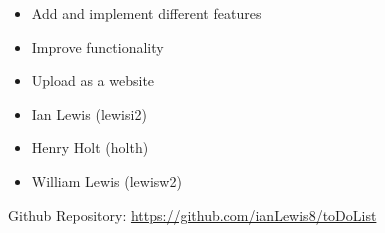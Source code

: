 \documentclass[12pt]{article}
\begin{document}
\begin{itemize}
  \item Add and implement different features
  \item Improve functionality
  \item Upload as a website
\end{itemize}

\newpage


\begin{itemize}
  \item Ian Lewis (lewisi2)
  \item Henry Holt (holth)
  \item William Lewis (lewisw2)
\end{itemize}

\bigskip

\noindent Github Repository: \url{https://github.com/ianLewis8/toDoList}
\end{document}
